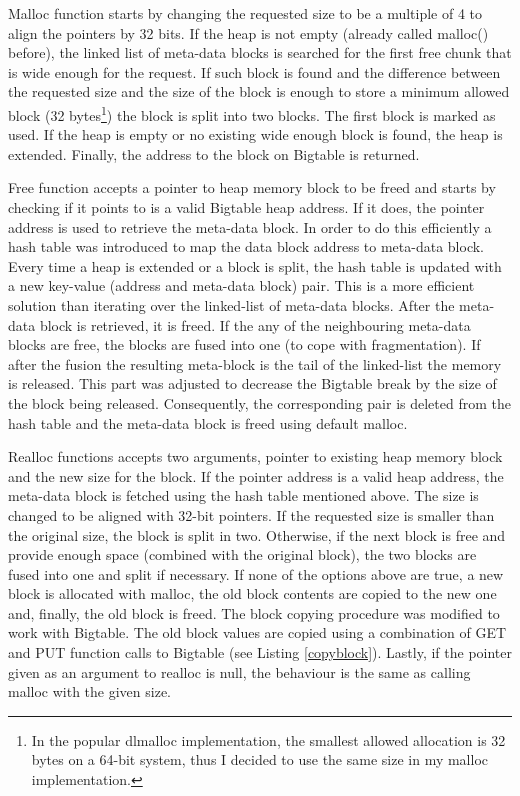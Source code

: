 \documentclass[bsc,frontabs,twoside,singlespacing,parskip,deptreport]{infthesis}     %
\begin{document}
Malloc function starts by changing the requested size to be a multiple of 4 to align the pointers by 32 bits. If the heap is not empty (already called malloc() before), the linked list of meta-data blocks is searched for the first free chunk that is wide enough for the request. If such block is found and the difference between the requested size and the size of the block is enough to store a minimum allowed block (32 bytes\footnote{In the popular dlmalloc \citep{leadlmalloc} implementation, the smallest allowed allocation is 32 bytes on a 64-bit system, thus I decided to use the same size in my malloc implementation.}) the block is split into two blocks. The first block is marked as used. If the heap is empty or no existing wide enough block is found, the heap is extended. Finally, the address to the block on Bigtable is returned.

Free function accepts a pointer to heap memory block to be freed and starts by checking if it points to is a valid Bigtable heap address. If it does, the pointer address is used to retrieve the meta-data block. In order to do this efficiently a hash table was introduced to map the data block address to meta-data block. Every time a heap is extended or a block is split, the hash table is updated with a new key-value (address and meta-data block) pair. This is a more efficient solution than iterating over the linked-list of meta-data blocks. After the meta-data block is retrieved, it is freed. If the any of the neighbouring meta-data blocks are free, the blocks are fused into one (to cope with fragmentation). If after the fusion the resulting meta-block is the tail of the linked-list the memory is released. This part was adjusted to decrease the Bigtable break by the size of the block being released. Consequently, the corresponding pair is deleted from the hash table and the meta-data block is freed using default malloc.

Realloc functions accepts two arguments, pointer to existing heap memory block and the new size for the block. If the pointer address is a valid heap address, the meta-data block is fetched using the hash table mentioned above. The size is changed to be aligned with 32-bit pointers. If the requested size is smaller than the original size, the block is split in two. Otherwise, if the next block is free and provide enough space (combined with the original block), the two blocks are fused into one and split if necessary. If none of the options above are true, a new block is allocated with malloc, the old block contents are copied to the new one and, finally, the old block is freed. The block copying procedure was modified to work with Bigtable. The old block values are copied using a combination of GET and PUT function calls to Bigtable (see Listing \ref{copyblock}). Lastly, if the pointer given as an argument to realloc is null, the behaviour is the same as calling malloc with the given size.
\end{document}
